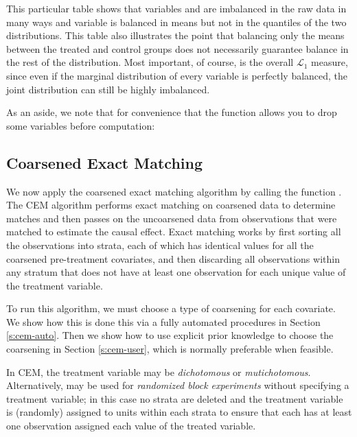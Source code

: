 \documentclass[article]{jss}
\begin{document}
This particular table shows that variables  and 
are imbalanced in the raw data in many ways and variable  is
balanced in means but not in the quantiles of the two distributions.
This table also illustrates the point that balancing only the means
between the treated and control groups does not necessarily guarantee
balance in the rest of the distribution.  Most important, of course,
is the overall $\mathcal L_1$ measure, since even if the marginal
distribution of every variable is perfectly balanced, the joint
distribution can still be highly imbalanced.

As an aside, we note that for convenience that the function
 allows you to drop some variables before computation:
\begin{Schunk}
\end{Schunk}


\subsection{Coarsened Exact Matching}\label{sec:cem}

We now apply the coarsened exact matching algorithm by calling the
function .  The CEM algorithm performs exact matching on
coarsened data to determine matches and then passes on the uncoarsened
data from observations that were matched to estimate the causal
effect.  Exact matching works by first sorting all the observations
into strata, each of which has identical values for all the coarsened
pre-treatment covariates, and then discarding all observations within
any stratum that does not have at least one observation for each
unique value of the treatment variable.

To run this algorithm, we must choose a type of coarsening for each
covariate.  We show how this is done this via a fully automated
procedures in Section \ref{s:cem-auto}.  Then we show how to use
explicit prior knowledge to choose the coarsening in Section
\ref{s:cem-user}, which is normally preferable when feasible.

In CEM, the treatment variable may be \emph{dichotomous} or
\emph{mutichotomous}.  Alternatively,  may be used for
\emph{randomized block experiments} without specifying a treatment
variable; in this case no strata are deleted and the treatment
variable is (randomly) assigned to units within each strata to ensure
that each has at least one observation assigned each value of the
treated variable.
\end{document}
